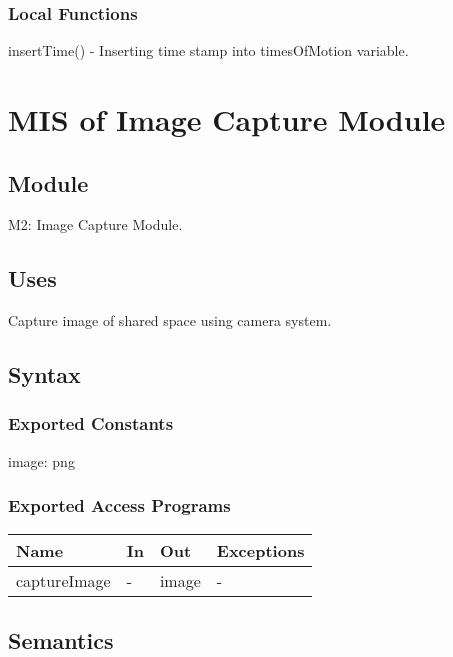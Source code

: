 \documentclass[12pt, titlepage]{article}
\begin{document}
\subsubsection{Local Functions}

insertTime() - Inserting time stamp into timesOfMotion variable.


\newpage

\section{MIS of Image Capture Module} \label{Module} 

\subsection{Module}

M2: Image Capture Module.

\subsection{Uses}
Capture image of shared space using camera system.

\subsection{Syntax}

\subsubsection{Exported Constants}
image: png

\subsubsection{Exported Access Programs}

\begin{center}
\begin{tabular}{p{4cm} p{4cm} p{4cm} p{2cm}}
\hline
\textbf{Name} & \textbf{In} & \textbf{Out} & \textbf{Exceptions} \\
\hline
captureImage & - & image & - \\
\hline
\end{tabular}
\end{center}

\subsection{Semantics}
\end{document}
